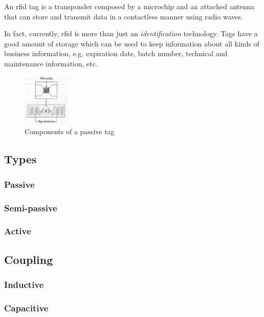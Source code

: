 An \ac{rfid} tag is a transponder composed by a microchip and an attached antenna that can store and transmit data in a contactless manner using radio waves.

In fact, currently, \ac{rfid} is more than just an \emph{identification} technology. Tags have a good amount of storage which can be used to keep information about all kinds of business information, e.g. expiration date, batch number, technical and maintenance information, etc.

\begin{figure}[!ht]
    \centering
    \includegraphics[width=0.2\textwidth]{./figs/02-state-of-the-art/tag.jpg}
    \caption{Components of a passive tag~\cite{lahiriRFIDSourcebook2005}} 
    \label{fig:passivetag}
\end{figure}

\subsection{Types}
\subsubsection{Passive}
\subsubsection{Semi-passive}
\subsubsection{Active}

\subsection{Coupling}
\subsubsection{Inductive}
\subsubsection{Capacitive}
